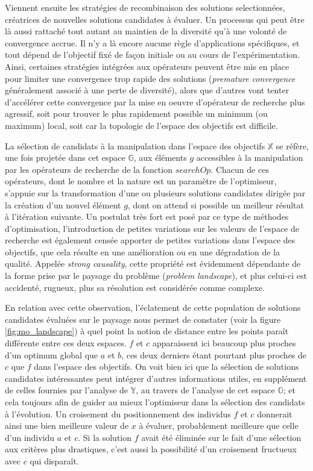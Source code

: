 Viennent ensuite les stratégies de recombinaison des solutions selectionnées, créatrices de nouvelles solutions candidates à évaluer. Un processus qui peut être là aussi rattaché tout autant au maintien de la diversité qu'à une volonté de convergence accrue. Il n'y a là encore aucune règle d'applications spécifiques, et tout dépend de l'objectif fixé de façon initiale ou au cours de l'expérimentation. Ainsi, certaines stratégies intégrées aux opérateurs peuvent être mis en place pour limiter une convergence trop rapide des solutions (\textit{premature convergence} généralement associé à une perte de diversité), alors que d'autres vont tenter d'accélérer cette convergence par la mise en oeuvre d'opérateur de recherche plus agressif, soit pour trouver le plus rapidement possible un minimum (ou maximum) local, soit car la topologie de l'espace des objectifs est difficile.

La sélection de candidats à la manipulation dans l'espace des objectifs $\mathbb{X}$ se réfère, une fois projetée dans cet espace $\mathbb{G}$, aux éléments $g$ accessibles à la manipulation par les opérateurs de recherche de la fonction $searchOp$. Chacun de ces opérateurs, dont le nombre et la nature est un paramètre de l'optimiseur, s'appuie sur la transformation d'une ou plusieurs solutions candidates dirigée par la création d'un nouvel élément $g$, dont on attend si possible un meilleur résultat à l'itération suivante. Un postulat très fort est posé par ce type de méthodes d'optimisation, l'introduction de petites variations sur les valeurs de l'espace de recherche est également censée apporter de petites variations dans l'espace des objectifs, que cela résulte en une amélioration ou en une dégradation de la qualité. Appelée \textit{strong causality}, cette propriété est évidemment dépendante de la forme prise par le paysage du problème (\textit{problem landscape}), et plus celui-ci est accidenté, rugueux, plus sa résolution est considérée comme complexe.

En relation avec cette observation, l'éclatement de cette population de solutions candidates évaluées sur le paysage nous permet de constater (voir la figure \ref{fig:mo_landscape}) à quel point la notion de distance entre les points paraît différente entre ces deux espaces. $f$ et $c$ apparaissent ici beaucoup plus proches d'un optimum global que $a$ et $b$, ces deux derniers étant pourtant plus proches de $c$ que $f$ dans l'espace des objectifs. On voit bien ici que la sélection de solutions candidates intéressantes peut intégrer d'autres informations utiles, en supplément de celles fournies par l'analyse de $\mathbb{Y}$, au travers de l'analyse de cet espace $\mathbb{G}$; et cela toujours afin de guider au mieux l'optimiseur dans la sélection des candidats à l'évolution. Un croisement du positionnement des individus $f$ et $c$ donnerait ainsi une bien meilleure valeur de $x$ à évaluer, probablement meilleure que celle d'un individu $a$ et $c$. Si la solution $f$ avait été éliminée sur le fait d'une sélection aux critères plus drastiques, c'est aussi la possibilité d'un croisement fructueux avec $c$ qui disparaît.

